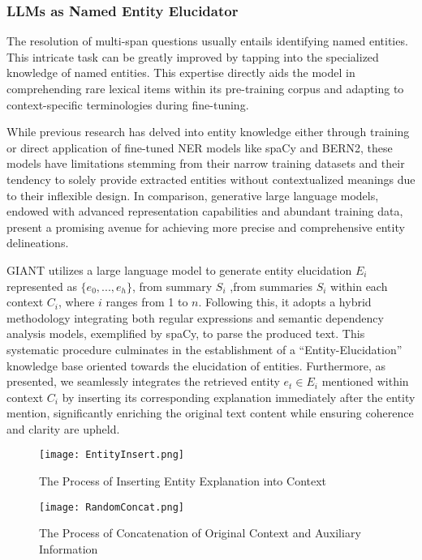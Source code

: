 \subsubsection{LLMs as Named Entity Elucidator}
\label{sec:LLMs as Named Entity Elucidator}
 The resolution of multi-span questions usually entails identifying named entities. This intricate task can be greatly improved by tapping into the specialized knowledge of named entities. This expertise directly aids the model in comprehending rare lexical items within its pre-training corpus and adapting to context-specific terminologies during fine-tuning. 
  
 While previous research has delved into entity knowledge either through training or direct application of fine-tuned NER models like spaCy and BERN2, these models have limitations stemming from their narrow training datasets and their tendency to solely provide extracted entities without contextualized meanings due to their inflexible design.  
 In comparison, generative large language models, endowed with advanced representation capabilities and abundant training data, present a promising avenue for achieving more precise and comprehensive entity delineations.
  
 GIANT utilizes a large language model to generate entity elucidation $E_i$ represented as $\{e_0,...,e_h\}$, from summary $S_i$ ,from summaries $S_i$ within each context $C_i$, where $i$ ranges from 1 to $n$. 
 Following this, it adopts a hybrid methodology integrating both regular expressions and semantic dependency analysis models, exemplified by spaCy, to parse the produced text.
 This systematic procedure culminates in the establishment of a ``Entity-Elucidation'' knowledge base oriented towards the elucidation of entities. 
 Furthermore, as  presented, we seamlessly integrates the retrieved entity $e_t \in E_i$ mentioned within context $C_i$ by inserting its corresponding explanation immediately after the entity mention, significantly enriching the original text content while ensuring coherence and clarity are upheld.
 
\begin{figure*}[h]
	\centering
	\texttt{[image: EntityInsert.png]}
	\caption{The Process of Inserting Entity Explanation into Context}
	\label{fig:entity_insertion}
\end{figure*}

\begin{figure*}[h]
	\centering
	\texttt{[image: RandomConcat.png]}
	\caption{The Process of Concatenation of Original Context and Auxiliary Information}
	\label{fig:random_concatenate}
\end{figure*}  

